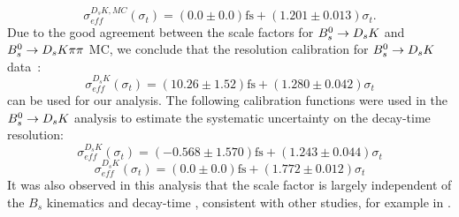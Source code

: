 \begin{equation}
\sigma_{eff}^{D_sK,MC}(\sigma_t) = \left( 0.0 \pm 0.0 \right) \text{fs} + \left( 1.201 \pm 0.013 \right) \sigma_t  .
\label{eq:scaleFactorDsKMC}
\end{equation}
Due to the good agreement between the scale factors for  ${{B}^0_{s}}\rightarrow{\ensuremath{{D}_{s}}}{\ensuremath{K}}$ and ${{B}^0_{s}}\rightarrow{\ensuremath{{D}_{s}}}{\ensuremath{K}}{\ensuremath{\pi}}{\ensuremath{\pi}}$ MC, we conclude that 
the resolution calibration for ${{B}^0_{s}}\rightarrow{\ensuremath{{D}_{s}}}{\ensuremath{K}}$ data~\cite{Aaij:2017lff}:
\begin{equation}
\sigma_{eff}^{D_sK}(\sigma_t) = \left( 10.26 \pm 1.52 \right) \text{fs} + \left( 1.280 \pm 0.042 \right) \sigma_t
\label{eq:scaleFactorDsK}
\end{equation}
can be used for our analysis.
The following calibration functions were used in the ${{B}^0_{s}}\rightarrow{\ensuremath{{D}_{s}}}{\ensuremath{K}}$ analysis to estimate the systematic uncertainty on the decay-time resolution:
\begin{equation}
\sigma_{eff}^{D_sK}(\sigma_t) = \left( -0.568 \pm 1.570 \right) \text{fs} + \left( 1.243 \pm 0.044 \right) \sigma_t
\label{eq:scaleFactorDsK2}
\end{equation}
\begin{equation}
\sigma_{eff}^{D_sK}(\sigma_t) = \left( 0.0 \pm 0.0 \right) \text{fs} + \left( 1.772 \pm 0.012 \right) \sigma_t
\label{eq:scaleFactorDsK3}
\end{equation}
It was also observed in this analysis that the scale factor is 
largely independent of the $B_s$ kinematics and decay-time \cite{Battista:2196464},
consistent with other studies, for example in \cite{Schiller:1325608}.


